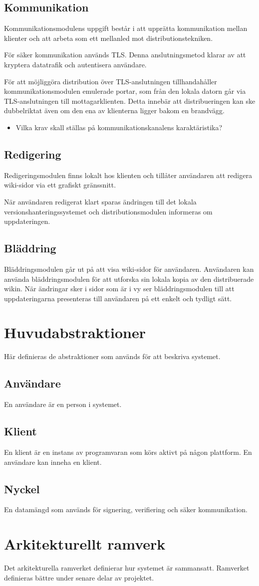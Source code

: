 \subsection{Kommunikation}
Kommunikationsmodulens uppgift består i att upprätta kommunikation
mellan klienter och att arbeta som ett mellanled mot
distributionstekniken.

För säker kommunikation används TLS. Denna anslutningsmetod klarar av
att kryptera datatrafik och autentisera användare.

För att möjliggöra distribution över TLS-anslutningen tillhandahåller
kommunikationsmodulen emulerade portar, som från den lokala datorn går
via TLS-anslutningen till mottagarklienten. Detta innebär att
distribueringen kan ske dubbelriktat även om den ena av klienterna
ligger bakom en brandvägg.

\begin{itemize}
\item Vilka krav skall ställas på kommunikationskanalens karaktäristika?
\end{itemize}
\subsection{Redigering}
Redigeringsmodulen finns lokalt hos klienten och tillåter användaren
att redigera wiki-sidor via ett grafiskt gränssnitt.

När användaren redigerat klart sparas ändringen till det lokala
versionshanteringssystemet och distributionsmodulen informeras om
uppdateringen.
\subsection{Bläddring}
Bläddringsmodulen går ut på att visa wiki-sidor för
användaren. Användaren kan använda bläddringsmodulen för att utforska
sin lokala kopia av den distribuerade wikin. När ändringar sker i
sidor som är i vy ser bläddringsmodulen till att uppdateringarna
presenteras till användaren på ett enkelt och tydligt sätt.
\section{Huvudabstraktioner}
Här definieras de abstraktioner som används för att beskriva systemet.
\subsection*{Användare}
En användare är en person i systemet. 
\subsection*{Klient}
En klient är en instans av programvaran som körs aktivt på någon
plattform. En användare kan inneha en klient.
\subsection*{Nyckel}
En datamängd som används för signering, verifiering och säker kommunikation.
\section{Arkitekturellt ramverk}
Det arkitekturella ramverket definierar hur systemet är
sammansatt. Ramverket definieras bättre under senare delar av
projektet.

